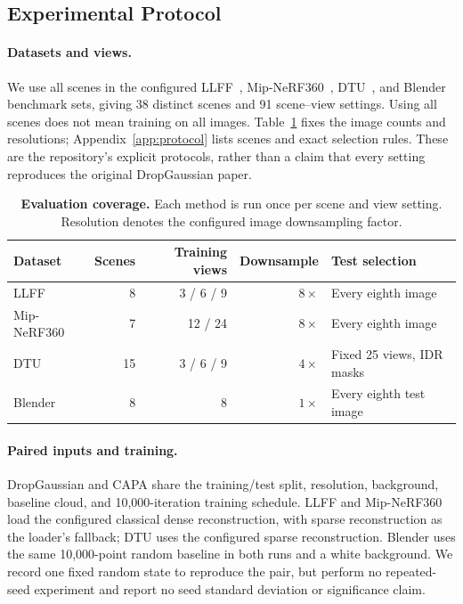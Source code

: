 \documentclass{article}
\newcommand{\ours}{CAPA}
\begin{document}
\subsection{Experimental Protocol}
\label{sec:protocol}

\paragraph{Datasets and views.}
We use all scenes in the configured LLFF~\citep{mildenhall2019llff}, Mip-NeRF360~\citep{barron2022mipnerf360}, DTU~\citep{jensen2014large}, and Blender~\citep{mildenhall2020nerf} benchmark sets, giving 38 distinct scenes and 91 scene--view settings. Using all scenes does not mean training on all images. Table~\ref{tab:protocol} fixes the image counts and resolutions; Appendix~\ref{app:protocol} lists scenes and exact selection rules. These are the repository's explicit protocols, rather than a claim that every setting reproduces the original DropGaussian paper.

\begin{table}[t]
\caption{\textbf{Evaluation coverage.} Each method is run once per scene and view setting. Resolution denotes the configured image downsampling factor.}
\label{tab:protocol}
\centering\small
\begin{tabular}{@{}lrrrl@{}}
\toprule
Dataset & Scenes & Training views & Downsample & Test selection\\
\midrule
LLFF & 8 & 3 / 6 / 9 & $8\times$ & Every eighth image\\
Mip-NeRF360 & 7 & 12 / 24 & $8\times$ & Every eighth image\\
DTU & 15 & 3 / 6 / 9 & $4\times$ & Fixed 25 views, IDR masks\\
Blender & 8 & 8 & $1\times$ & Every eighth test image\\
\bottomrule
\end{tabular}
\end{table}

\paragraph{Paired inputs and training.}
DropGaussian and \ours{} share the training/test split, resolution, background, baseline cloud, and 10,000-iteration training schedule. LLFF and Mip-NeRF360 load the configured classical dense reconstruction, with sparse reconstruction as the loader's fallback; DTU uses the configured sparse reconstruction. Blender uses the same 10,000-point random baseline in both runs and a white background. We record one fixed random state to reproduce the pair, but perform no repeated-seed experiment and report no seed standard deviation or significance claim.
\end{document}
